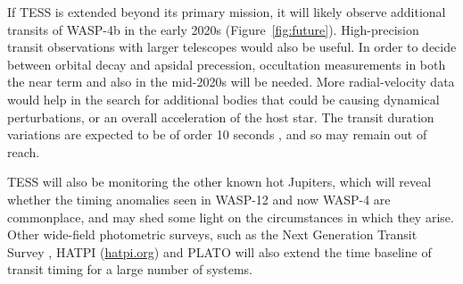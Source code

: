 \documentclass[12pt,twocolumn,tighten]{aastex62}
\begin{document}
If TESS is extended beyond its primary mission, it will likely observe
additional transits of WASP-4b in the early 2020s
(Figure~\ref{fig:future}).  High-precision transit observations with
larger telescopes would also be useful.  In order to decide between
orbital decay and apsidal precession, occultation measurements in both
the near term and also in the mid-2020s will be needed.  More
radial-velocity data would help in the search for additional bodies
that could be causing dynamical perturbations, or an overall
acceleration of the host star.  The transit duration variations are
expected to be of order 10 seconds \citep{pal_periastron_2008}, and so
may remain out of reach.

TESS will also be monitoring the other known hot Jupiters, which will
reveal whether the timing anomalies seen in WASP-12 and now WASP-4 are
commonplace, and may shed some light on the circumstances in which
they arise. Other wide-field photometric surveys, such as the Next
Generation Transit Survey \citep{wheatley_next_2018}, HATPI
(\href{https://hatpi.org}{hatpi.org}) and PLATO
\citep{rauer_plato_2014} will also extend the time baseline of transit
timing for a large number of systems.
\end{document}
